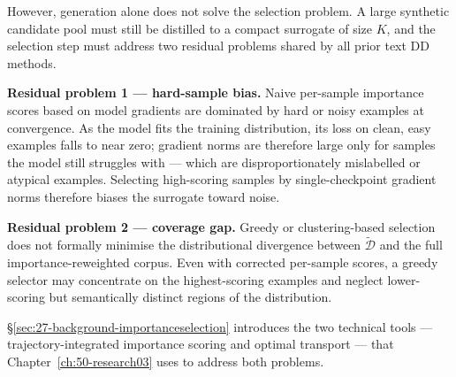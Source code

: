 \begin{foldable}
  However, generation alone does not solve the selection problem.
  A large synthetic candidate pool must still be distilled to a compact surrogate of size $K$, and the selection step must address two residual problems shared by all prior text DD methods.
\end{foldable}

\begin{foldable}
  \textbf{Residual problem 1 --- hard-sample bias.}
  Naive per-sample importance scores based on model gradients are dominated by hard or noisy examples at convergence.
  As the model fits the training distribution, its loss on clean, easy examples falls to near zero; gradient norms are therefore large only for samples the model still struggles with --- which are disproportionately mislabelled or atypical examples.
  Selecting high-scoring samples by single-checkpoint gradient norms therefore biases the surrogate toward noise.
\end{foldable}

\begin{foldable}
  \textbf{Residual problem 2 --- coverage gap.}
  Greedy or clustering-based selection does not formally minimise the distributional divergence between $\tilde{\mathcal{D}}$ and the full importance-reweighted corpus.
  Even with corrected per-sample scores, a greedy selector may concentrate on the highest-scoring examples and neglect lower-scoring but semantically distinct regions of the distribution.
\end{foldable}

\begin{foldable}
  \S\ref{sec:27-background-importanceselection} introduces the two technical tools --- trajectory-integrated importance scoring and optimal transport --- that Chapter~\ref{ch:50-research03} uses to address both problems.
\end{foldable}
